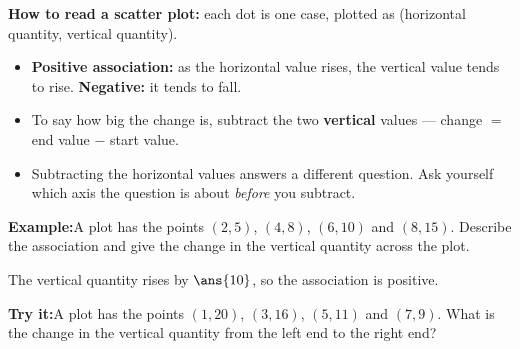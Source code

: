 \documentclass[12pt]{article}
\begin{document}


\begin{formulabox}
\textbf{How to read a scatter plot:} each dot is one case, plotted as
(horizontal quantity, vertical quantity).
\begin{itemize}[leftmargin=0.8cm, itemsep=1pt, topsep=2pt]
  \item \textbf{Positive association:} as the horizontal value rises, the
        vertical value tends to rise. \textbf{Negative:} it tends to fall.
  \item To say how big the change is, subtract the two \textbf{vertical}
        values --- change $=$ end value $-$ start value.
  \item Subtracting the horizontal values answers a different question. Ask
        yourself which axis the question is about \emph{before} you subtract.
\end{itemize}
\end{formulabox}

\begin{examplebox}
\textbf{Example:}\quad A plot has the points $(2, 5)$, $(4, 8)$, $(6, 10)$ and
$(8, 15)$. Describe the association and give the change in the vertical
quantity across the plot.



The vertical quantity rises by $\ans{10}$, so the association is positive.
\end{examplebox}

\begin{tryitbox}
\textbf{Try it:}\quad A plot has the points $(1, 20)$, $(3, 16)$, $(5, 11)$ and
$(7, 9)$. What is the change in the vertical quantity from the left end to the
right end?

\end{tryitbox}

\end{document}
